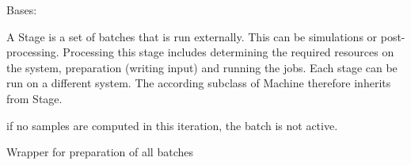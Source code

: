 \documentclass[letterpaper,10pt,english]{sphinxmanual}
\begin{document}
\begin{fulllineitems}
\label{\detokenize{simulation:simulation.simulation.Stage}}
Bases: 

A Stage is a set of batches that is run externally. 
This can be simulations or post-processing. 
Processing this stage includes determining the required resources
on the system, preparation (writing input) and running the jobs. 
Each stage can be run on a different system. The according subclass
of Machine therefore inherits from Stage.

\begin{fulllineitems}
\label{\detokenize{simulation:simulation.simulation.Stage.active_batches}}
if no samples are computed in this iteration, 
the batch is not active.

\end{fulllineitems}


\begin{fulllineitems}
\label{\detokenize{simulation:simulation.simulation.Stage.check_all_finished}}
\end{fulllineitems}


\begin{fulllineitems}
\label{\detokenize{simulation:simulation.simulation.Stage.fill}}
\end{fulllineitems}


\begin{fulllineitems}
\label{\detokenize{simulation:simulation.simulation.Stage.prepare_set}}
Wrapper for preparation of all batches


\end{fulllineitems}
\end{fulllineitems}
\end{document}
